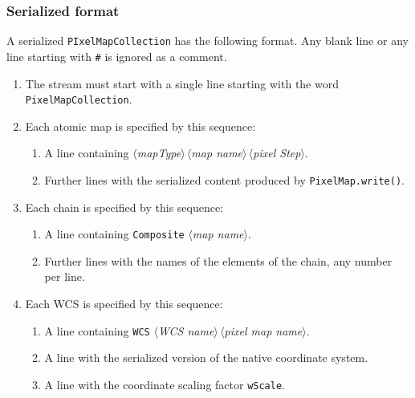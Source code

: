 \documentclass[11pt,preprint,flushrt]{aastex}
\begin{document}
\subsubsection{Serialized format}
A serialized {\tt PIxelMapCollection} has the following format.  Any blank line or any line starting with {\tt \#} is ignored as a comment.  
\begin{enumerate}
\item The stream must start with a single line starting with the word {\tt PixelMapCollection}.
\item Each atomic map is specified by this sequence:
\begin{enumerate}
\item A line containing {\it $\langle$mapType$\rangle\,\langle$map name$\rangle\,\langle$pixel Step$\rangle$}.
\item Further lines with the serialized content produced by {\tt PixelMap.write()}.
\end{enumerate}
\item Each chain is specified by this sequence:
\begin{enumerate}
\item A line containing {\tt Composite} {\it $\langle$map name$\rangle$}.
\item Further lines with the names of the elements of the chain, any number per line.
\end{enumerate}
\item Each WCS is specified by this sequence:
\begin{enumerate}
\item A line containing {\tt WCS} {\it $\langle$WCS name$\rangle\,\langle$pixel map name$\rangle$}.
\item A line with the serialized version of the native coordinate system.
\item A line with the coordinate scaling factor {\tt wScale}.
\end{enumerate}
\end{enumerate}
\end{document}
